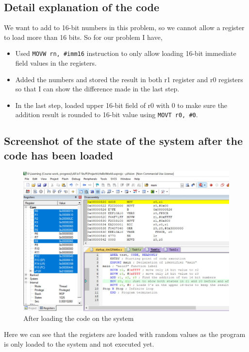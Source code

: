 \documentclass[footheight=20pt, footsepline, headheight=20pt, headsepline]{scrartcl}
\begin{document}
\subsection*{Detail explanation of the code}
We want to add to 16-bit numbers in this problem, so we cannot allow a register to load more than 16 bits. So for our problem I have,
\begin{itemize}
    \item Used \verb|MOVW rn, #imm16| instruction to only allow loading 16-bit immediate field values in the registers.
    \item Added the numbers and stored the result in both r1 register and r0 registers so that I can show the difference made in the last step.
    \item In the last step, loaded upper 16-bit field of r0 with 0 to make sure the addition result is rounded to 16-bit value using \verb|MOVT r0, #0|.
\end{itemize}
\subsection*{Screenshot of the state of the system after the code has been loaded}
\begin{figure}[ht]
    \centering
    \includegraphics[scale=.75]{images/Task3Before1.jpg}
    \caption{After loading the code on the system}
    \label{fig:before_task_three}
\end{figure}
\FloatBarrier
Here we can see that the registers are loaded with random values as the program is only loaded to the system and not executed yet. 
\end{document}
